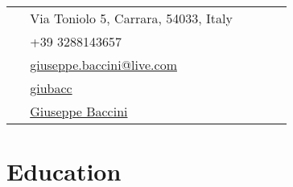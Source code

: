 \documentclass[10pt]{article} %
\begin{document}
\begin{paracol}{2}
\parbox[top][0.12\textheight][c]{\linewidth}{ %
	\vspace{-0.04\textheight} %
	\colorbox{shade}{ %
		\begin{supertabular}{p{0.05\linewidth}|p{0.775\linewidth}} %
			\raisebox{-1pt}{\faHome} & Via Toniolo 5, Carrara, 54033, Italy \\ %
			\raisebox{-1pt}{\faPhone} & +39 3288143657 \\ %
			\raisebox{0pt}{\small\faEnvelope} & \href{mailto:giuseppe.baccini@live.com}{giuseppe.baccini@live.com} \\ %
			\raisebox{-1pt}{\faGithub} & \href{https://github.com/giubacc}{giubacc} \\ %
			\raisebox{-1pt}{\faLinkedinSquare} & \href{https://www.linkedin.com/in/giuseppe-baccini-0288687}{Giuseppe Baccini} \\ %
		\end{supertabular}
	}
}


\section{Education}





\begin{supertabular}{rl} %



\end{supertabular}
\end{paracol}
\end{document}
